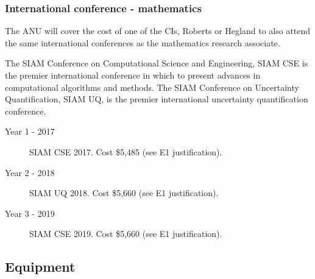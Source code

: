 \documentclass[a4paper,fontsize=12pt]{scrartcl}
\begin{document}
\subsubsection*{International conference - mathematics}

The ANU will cover the cost of one of the CIs, Roberts or Hegland to also attend the same international conferences as the mathematics research associate. 

The SIAM Conference on Computational Science and Engineering, SIAM CSE is the premier international conference in which to present advances in computational algorithms and methods. 
The SIAM Conference on Uncertainty Quantification, SIAM UQ, is the premier international uncertainty quantification conference.

\begin{description}
\item[Year 1 - 2017] SIAM CSE 2017.  Cost \$5,485   (see E1 justification).

\item[Year 2 - 2018] SIAM UQ 2018.  Cost \$5,660   (see E1 justification).

\item[Year 3 - 2019]  SIAM CSE 2019.  Cost \$5,660   (see E1 justification).

\end{description}

\subsection*{Equipment}







\end{document}
